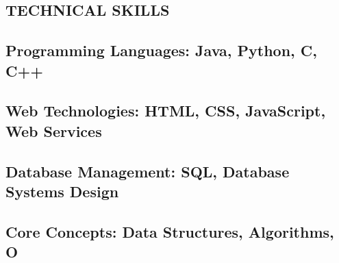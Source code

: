 \subsection*{TECHNICAL SKILLS}

\subsection*{Programming Languages: Java, Python, C, C++}

\subsection*{Web Technologies: HTML, CSS, JavaScript, Web Services}

\subsection*{Database Management: SQL, Database Systems Design}

\subsection*{Core Concepts: Data Structures, Algorithms, O}